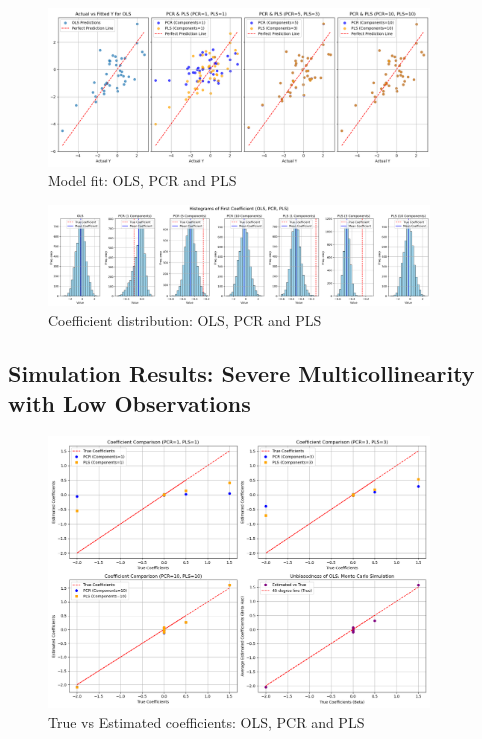 \documentclass[11pt,twoside,a4paper]{article}
\begin{document}
\begin{figure}[H]
    \centering
    \includegraphics[width=0.9\textwidth]{Third_plot_second_simulation.png}
    \caption{Model fit: OLS, PCR and PLS}
    \label{fig:Moderate_multicollinear_data_analysis}
\end{figure}

\begin{figure}[H]
    \centering
    \includegraphics[width=0.9\textwidth]{Fourth_plot_second_simulation.png}
    \caption{Coefficient distribution: OLS, PCR and PLS}
    \label{fig:Moderate_multicollinear_data_analysis}
\end{figure}

\subsection{Simulation Results: Severe Multicollinearity with Low Observations}

\begin{figure}[H]
    \centering
    \includegraphics[width=0.9\textwidth]{First_plot_third_simulation.png}
    \caption{True vs Estimated coefficients: OLS, PCR and PLS}
    \label{fig:Severe_multicollinear_data_analysis}
\end{figure}
\end{document}

